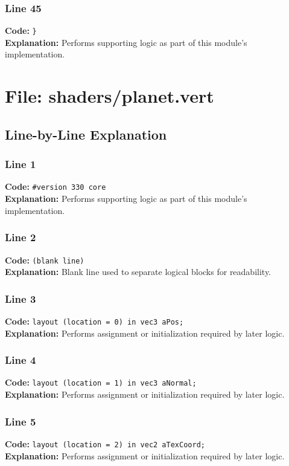 \documentclass[11pt,a4paper]{article}
\begin{document}
\subsubsection*{Line 45}
\textbf{Code:} \verb|}|\\
\textbf{Explanation:} Performs supporting logic as part of this module's implementation.

\newpage
\section{File: shaders/planet.vert}
\subsection{Line-by-Line Explanation}
\subsubsection*{Line 1}
\textbf{Code:} \verb|#version 330 core|\\
\textbf{Explanation:} Performs supporting logic as part of this module's implementation.

\subsubsection*{Line 2}
\textbf{Code:} \texttt{(blank line)}\\
\textbf{Explanation:} Blank line used to separate logical blocks for readability.

\subsubsection*{Line 3}
\textbf{Code:} \verb|layout (location = 0) in vec3 aPos;|\\
\textbf{Explanation:} Performs assignment or initialization required by later logic.

\subsubsection*{Line 4}
\textbf{Code:} \verb|layout (location = 1) in vec3 aNormal;|\\
\textbf{Explanation:} Performs assignment or initialization required by later logic.

\subsubsection*{Line 5}
\textbf{Code:} \verb|layout (location = 2) in vec2 aTexCoord;|\\
\textbf{Explanation:} Performs assignment or initialization required by later logic.
\end{document}
